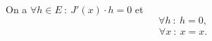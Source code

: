 On a $\forall h \in E ~:~ J'(x) \cdot h = 0$ et
\[
  \forall h ~:~ h = 0,
\]
\begin{align*}
  \forall x ~:~ x = x.
\end{align*}
